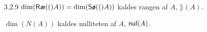%

\begin{notation}{3.2.9}
	$\dim(\row(A)) = \dim(\sor(A))$ kaldes rangen af $A$, $\rang(A)$.
	
	$\dim(N(A))$ kaldes nulliteten af $A$, $\nul(A)$.
\end{notation}

